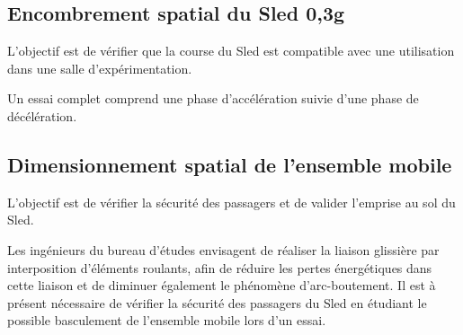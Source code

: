\subsection{Encombrement spatial du Sled 0,3g \label{ccs_mp_2022_sec_2A}}

\begin{obj}
L'objectif est de vérifier que la course du Sled est compatible avec une utilisation dans une salle d'expérimentation.
\end{obj}





Un essai complet comprend une phase d'accélération suivie d'une phase de décélération.


\subsection{Dimensionnement spatial de l'ensemble mobile \label{ccs_mp_2022_sec_2B}}

\begin{obj}
L'objectif est de vérifier la sécurité des passagers et de valider l'emprise au sol du Sled.

Les ingénieurs du bureau d'études envisagent de réaliser la liaison glissière par interposition d'éléments roulants, afin de réduire les pertes énergétiques dans cette liaison et de diminuer également le phénomène d'arc-boutement. Il est à présent nécessaire de vérifier la sécurité des passagers du Sled en étudiant le possible basculement de l'ensemble mobile lors d'un essai.
\end{obj}


